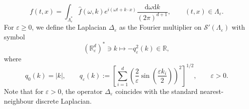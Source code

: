 \documentclass{article}
\numberwithin{equation}{section}
\newcommand{\assign}{:=}
\newcommand{\mathd}{\mathrm{d}}
\theoremstyle{plain}
\theoremstyle{definition}
\begin{document}
\[ f (t, x) = \int_{\Lambda^{\ast}_{\varepsilon}}  \hat{f} (\omega, k) e^{i
   (\omega t + k \cdot x)} \frac{\mathd \omega \mathd k}{(2 \pi)^{d + 1}},
   \qquad (t, x) \in \Lambda_{\varepsilon} . \]
For $\varepsilon \geqslant 0$, we define the Laplacian $\Delta_{\varepsilon}$
as the Fourier multiplier on $\mathcal{S}' (\Lambda_{\varepsilon})$ with
symbol
\[ (\mathbb{R}_{\varepsilon}^d)^{\ast} \ni k \mapsto - q_{\varepsilon}^2 (k)
   \in \mathbb{R}, \]
where
\begin{equation}
  q_0 (k) = | k |, \qquad q_{\varepsilon} (k) \assign \left[ \sum_{i = 1}^d
  \left( \frac{2}{\varepsilon} \sin \left(\frac{\varepsilon k_i}{2}\right)
  \right)^2 \right]^{1 / 2}, \qquad \varepsilon > 0. \label{eq:discrete-symbol}
\end{equation}
Note that for $\varepsilon > 0$, the operator $\Delta_{\varepsilon}$ coincides
with the standard nearest-neighbour discrete Laplacian.
\end{document}

